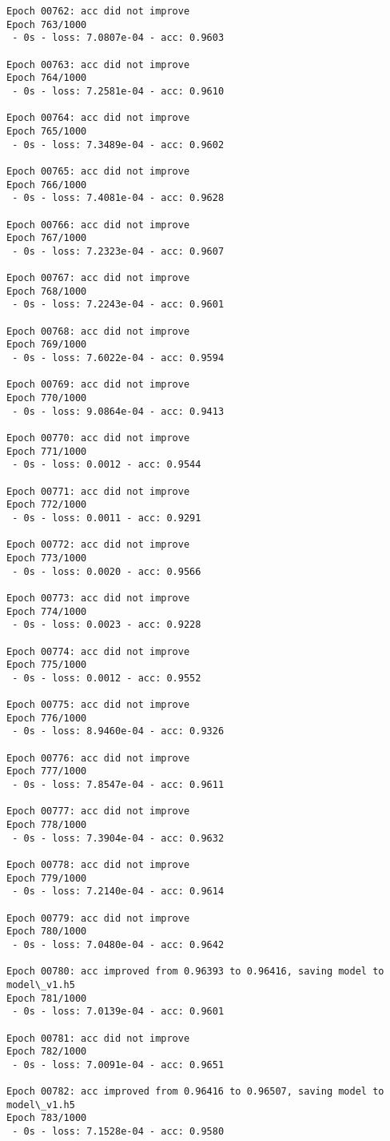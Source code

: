 \documentclass[11pt]{article}
\begin{document}
\begin{Verbatim}[commandchars=\\\{\}]
Epoch 00762: acc did not improve
Epoch 763/1000
 - 0s - loss: 7.0807e-04 - acc: 0.9603

Epoch 00763: acc did not improve
Epoch 764/1000
 - 0s - loss: 7.2581e-04 - acc: 0.9610

Epoch 00764: acc did not improve
Epoch 765/1000
 - 0s - loss: 7.3489e-04 - acc: 0.9602

Epoch 00765: acc did not improve
Epoch 766/1000
 - 0s - loss: 7.4081e-04 - acc: 0.9628

Epoch 00766: acc did not improve
Epoch 767/1000
 - 0s - loss: 7.2323e-04 - acc: 0.9607

Epoch 00767: acc did not improve
Epoch 768/1000
 - 0s - loss: 7.2243e-04 - acc: 0.9601

Epoch 00768: acc did not improve
Epoch 769/1000
 - 0s - loss: 7.6022e-04 - acc: 0.9594

Epoch 00769: acc did not improve
Epoch 770/1000
 - 0s - loss: 9.0864e-04 - acc: 0.9413

Epoch 00770: acc did not improve
Epoch 771/1000
 - 0s - loss: 0.0012 - acc: 0.9544

Epoch 00771: acc did not improve
Epoch 772/1000
 - 0s - loss: 0.0011 - acc: 0.9291

Epoch 00772: acc did not improve
Epoch 773/1000
 - 0s - loss: 0.0020 - acc: 0.9566

Epoch 00773: acc did not improve
Epoch 774/1000
 - 0s - loss: 0.0023 - acc: 0.9228

Epoch 00774: acc did not improve
Epoch 775/1000
 - 0s - loss: 0.0012 - acc: 0.9552

Epoch 00775: acc did not improve
Epoch 776/1000
 - 0s - loss: 8.9460e-04 - acc: 0.9326

Epoch 00776: acc did not improve
Epoch 777/1000
 - 0s - loss: 7.8547e-04 - acc: 0.9611

Epoch 00777: acc did not improve
Epoch 778/1000
 - 0s - loss: 7.3904e-04 - acc: 0.9632

Epoch 00778: acc did not improve
Epoch 779/1000
 - 0s - loss: 7.2140e-04 - acc: 0.9614

Epoch 00779: acc did not improve
Epoch 780/1000
 - 0s - loss: 7.0480e-04 - acc: 0.9642

Epoch 00780: acc improved from 0.96393 to 0.96416, saving model to model\_v1.h5
Epoch 781/1000
 - 0s - loss: 7.0139e-04 - acc: 0.9601

Epoch 00781: acc did not improve
Epoch 782/1000
 - 0s - loss: 7.0091e-04 - acc: 0.9651

Epoch 00782: acc improved from 0.96416 to 0.96507, saving model to model\_v1.h5
Epoch 783/1000
 - 0s - loss: 7.1528e-04 - acc: 0.9580


\end{Verbatim}
\end{document}
